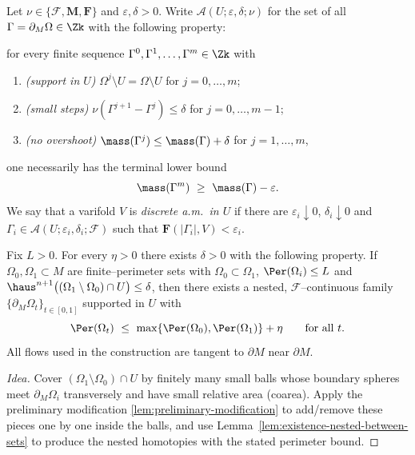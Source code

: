 \begin{definition}\label{def:dis-am-rel}
Let $\nu\in\{\mathcal F,\mathbf M,\mathbf F\}$ and $\varepsilon,\delta>0$.
Write $\mathscr A(U;\varepsilon,\delta;\nu)$ for the set of all
$\Gamma=\partial_M\Omega\in\Zk$ with the following property:

for every finite sequence $\Gamma^0,\Gamma^1,\dots,\Gamma^m\in\Zk$ with
\begin{enumerate}[label=(\roman*)]
\item \emph{(support in $U$)} $\Omega^j\setminus U=\Omega\setminus U$ for $j=0,\dots,m$;
\item \emph{(small steps)} $\nu(\Gamma^{j+1}-\Gamma^{j})\le \delta$ for $j=0,\dots,m-1$;
\item \emph{(no overshoot)} $\mass(\Gamma^{j})\le \mass(\Gamma)+\delta$ for $j=1,\dots,m$,
\end{enumerate}
one necessarily has the terminal lower bound
\[
\mass(\Gamma^{m})\ \ge\ \mass(\Gamma)-\varepsilon.
\]
We say that a varifold $V$ is \emph{discrete a.m.\ in $U$} if there are
$\varepsilon_i\downarrow 0$, $\delta_i\downarrow 0$ and $\Gamma_i\in\mathscr A(U;\varepsilon_i,\delta_i;\mathcal F)$
such that $\mathbf F(|\Gamma_i|,V)<\varepsilon_i$.
\end{definition}

\begin{lemma}\label{lem:relative-interpolation}
Fix $L>0$. For every $\eta>0$ there exists $\delta>0$ with the following property.
If $\Omega_0,\Omega_1\subset M$ are finite–perimeter sets with $\Omega_0\subset\Omega_1$,
$\Per(\Omega_i)\le L$ and $\haus^{n+1}\big((\Omega_1\setminus\Omega_0)\cap U\big)\le \delta$,
then there exists a nested, $\mathcal F$–continuous family
$\{\partial_M\Omega_t\}_{t\in[0,1]}$ supported in $U$ with
\[
\Per(\Omega_t)\ \le\ \max\{\Per(\Omega_0),\Per(\Omega_1)\}+\eta\qquad\text{for all }t.
\]
All flows used in the construction are tangent to $\partial M$ near $\partial M$.
\end{lemma}

\begin{proof}[Idea]
Cover $(\Omega_1\!\setminus\!\Omega_0)\cap U$ by finitely many small balls whose boundary spheres
meet $\partial_M\Omega_i$ transversely and have small relative area (coarea).
Apply the preliminary modification \ref{lem:preliminary-modification} to add/remove these pieces
one by one inside the balls, and use Lemma~\ref{lem:existence-nested-between-sets} to produce the
nested homotopies with the stated perimeter bound.
\end{proof}

